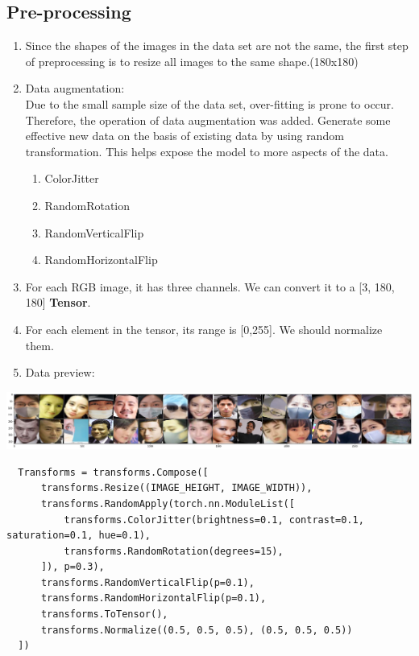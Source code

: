 \documentclass{article}
\begin{document}
  \subsection{Pre-processing}
  \begin{enumerate}
    \item Since the shapes of the images in the data set are not the same, the first step of preprocessing is to resize all images to the same shape.(180x180)
    \item Data augmentation:\\
          Due to the small sample size of the data set, over-fitting is prone to occur. Therefore, the operation of data augmentation was added. Generate some effective new data on the basis of existing data by using random transformation. This helps expose the model to more aspects of the data.

          \begin{enumerate}
            \item ColorJitter
            \item RandomRotation
            \item RandomVerticalFlip
            \item RandomHorizontalFlip
          \end{enumerate}
    \item For each RGB image, it has three channels. We can convert it to a [3, 180, 180] \textbf{Tensor}.
    \item For each element in the tensor, its range is [0,255]. We should normalize them.
    \item Data preview:
  \end{enumerate}
  \begin{center}
    \includegraphics[width=15cm]{preview.png}
  \end{center}
  \begin{lstlisting}
  Transforms = transforms.Compose([
      transforms.Resize((IMAGE_HEIGHT, IMAGE_WIDTH)),
      transforms.RandomApply(torch.nn.ModuleList([
          transforms.ColorJitter(brightness=0.1, contrast=0.1, saturation=0.1, hue=0.1),
          transforms.RandomRotation(degrees=15),
      ]), p=0.3),
      transforms.RandomVerticalFlip(p=0.1),
      transforms.RandomHorizontalFlip(p=0.1),
      transforms.ToTensor(),
      transforms.Normalize((0.5, 0.5, 0.5), (0.5, 0.5, 0.5))
  ])
  \end{lstlisting}
  
\end{document}
